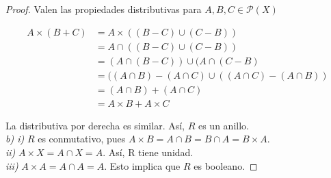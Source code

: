 \begin{proof}
\vspace{3mm}

Valen las propiedades distributivas para $A,B,C \in \mathcal{P}(X)$

\begin{equation*}
\begin{split}
    A\times (B+C) &= A\times( (B-C) \cup (C-B) )\\
                 &= A \cap( (B-C) \cup (C-B) )\\
                 &= (A \cap (B-C)) \cup (A \cap (C-B)\\
                 &= ((A \cap B) - (A \cap C) \cup ((A \cap C) - (A \cap B))\\
                 &= (A \cap B) + (A \cap C)\\
                 &= A \times B + A \times C
\end{split}
\end{equation*}

\vspace{3mm}

La distributiva por derecha es similar. Así, $R$ es un anillo.\\

\textit{b) i)} $R$ es conmutativo, pues $A \times B = A \cap B = B \cap A = B \times A$.\\

\textit{ii)} $A \times X = A \cap X = A$. Así, R tiene unidad.\\

\textit{iii)} $A \times A = A \cap A = A$. Esto implica que $R$ es booleano.







\end{proof}